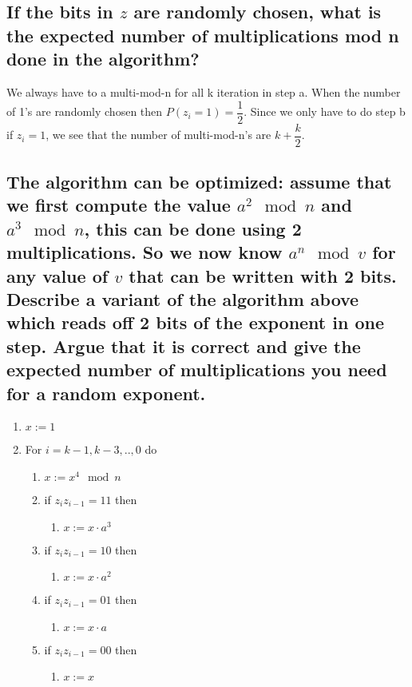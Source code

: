 \documentclass[paper=a4, fontsize=11pt]{scrartcl} %
\numberwithin{equation}{section} %
\numberwithin{figure}{section} %
\numberwithin{table}{section} %
\begin{document}
\subsection*{If the bits in $z$ are randomly chosen, what is the expected number of multiplications mod n done in the algorithm?}

We always have to a multi-mod-n for all k iteration in step a. When the number of 1's are randomly chosen then $P(z_i=1)=\dfrac{1}{2}$. Since we only have to do step b if $z_i=1$, we see that the number of multi-mod-n's are $k+\dfrac{k}{2}$.

\subsection*{The algorithm can be optimized: assume that we first compute the value $a^2\mod{n}$ and $a^3\mod{n}$, this can be done using 2 multiplications. So we now know $a^n\mod{v}$ for any value of $v$ that can be written with 2 bits. Describe a variant of the algorithm above which reads off 2 bits of the exponent in one step. Argue that it is correct and give the expected number of multiplications you need for a random exponent.}

\begin{enumerate}
\item $x:=1$
\item For $i=k-1,k-3,..,0$ do
\begin{enumerate}
\item $x:=x^4\mod{n}$
\item if $z_iz_{i-1} = 11$ then
\begin{enumerate}
\item $x:=x\cdot a^3$
\end{enumerate}
\item if $z_iz_{i-1} = 10$ then
\begin{enumerate}
\item $x:=x\cdot a^2$
\end{enumerate}
\item if $z_iz_{i-1} = 01$ then
\begin{enumerate}
\item $x:=x\cdot a$
\end{enumerate}
\item if $z_iz_{i-1} = 00$ then
\begin{enumerate}
\item $x:=x$
\end{enumerate}
\end{enumerate}
\end{enumerate}
\end{document}
